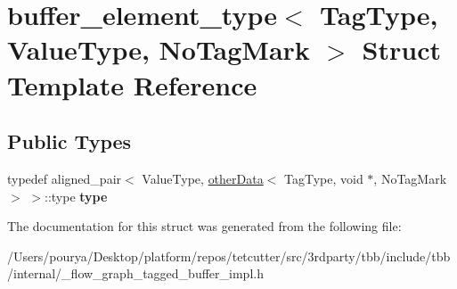 \hypertarget{structbuffer__element__type}{}\section{buffer\+\_\+element\+\_\+type$<$ Tag\+Type, Value\+Type, No\+Tag\+Mark $>$ Struct Template Reference}
\label{structbuffer__element__type}
\subsection*{Public Types}
\begin{DoxyCompactItemize}
\item 
\hypertarget{structbuffer__element__type_a76f784957d817cae08b724d96df3481d}{}typedef aligned\+\_\+pair$<$ Value\+Type, \hyperlink{structotherData}{other\+Data}$<$ Tag\+Type, void $\ast$, No\+Tag\+Mark $>$ $>$\+::type {\bfseries type}\label{structbuffer__element__type_a76f784957d817cae08b724d96df3481d}

\end{DoxyCompactItemize}


The documentation for this struct was generated from the following file\+:\begin{DoxyCompactItemize}
\item 
/\+Users/pourya/\+Desktop/platform/repos/tetcutter/src/3rdparty/tbb/include/tbb/internal/\+\_\+flow\+\_\+graph\+\_\+tagged\+\_\+buffer\+\_\+impl.\+h\end{DoxyCompactItemize}
